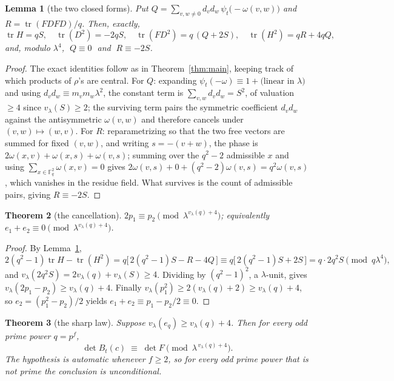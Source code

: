 \documentclass[11pt]{article}
\theoremstyle{plain}
\newtheorem{theorem}{Theorem}
\newtheorem{lemma}[theorem]{Lemma}
\theoremstyle{definition}
\newcommand{\FF}{\mathbb F}
\newcommand{\tr}{\operatorname{tr}}
\newcommand{\vlam}{v_\lambda}
\begin{document}
\begin{lemma}[the two closed forms]\label{lem:closed}
Put $Q=\sum_{v,w\neq0}d_vd_w\,\psi_t\bigl(-\omega(v,w)\bigr)$ and
$R=\tr(FDFD)/q$. Then, exactly,
\[
\tr H=qS,\quad \tr(D^2)=-2qS,\quad \tr(FD^2)=q\,(Q+2S),\quad
\tr(H^2)=qR+4qQ,
\]
and, modulo $\lambda^{4}$, $\;Q\equiv0\;$ and $\;R\equiv-2S$.
\end{lemma}

\begin{proof}
The exact identities follow as in Theorem~\ref{thm:main}, keeping track of
which products of $\rho$'s are central. For $Q$: expanding
$\psi_t(-\omega)\equiv1+\text{(linear in }\lambda)$ and using
$d_vd_w\equiv m_vm_w\lambda^2$, the constant term is
$\sum_{v,w}d_vd_w=S^2$, of valuation $\ge4$ since $\vlam(S)\ge2$; the surviving
term pairs the symmetric coefficient $d_vd_w$ against the antisymmetric
$\omega(v,w)$ and therefore cancels under $(v,w)\mapsto(w,v)$. For $R$:
reparametrizing so that the two free vectors are summed for fixed $(v,w)$, and
writing $s=-(v+w)$, the phase is $2\omega(x,v)+\omega(x,s)+\omega(v,s)$; summing
over the $q^2-2$ admissible $x$ and using
$\sum_{x\in\FF_q^2}\omega(x,v)=0$ gives
$2\omega(v,s)+0+(q^2-2)\omega(v,s)=q^{2}\omega(v,s)$, which vanishes in the
residue field. What survives is the count of admissible pairs, giving
$R\equiv-2S$.
\end{proof}

\begin{theorem}[the cancellation]\label{thm:cancel}
$2p_1\equiv p_2\pmod{\lambda^{\vlam(q)+4}}$; equivalently
$e_1+e_2\equiv0\pmod{\lambda^{\vlam(q)+4}}$.
\end{theorem}

\begin{proof}
By Lemma~\ref{lem:closed},
\[
2(q^2-1)\tr H-\tr(H^2)=q\bigl[\,2(q^2-1)S-R-4Q\,\bigr]
\equiv q\bigl[\,2(q^2-1)S+2S\,\bigr]=q\cdot 2q^2S \pmod{q\lambda^4},
\]
and $\vlam(2q^{2}S)=2\vlam(q)+\vlam(S)\ge4$. Dividing by $(q^2-1)^2$, a
$\lambda$-unit, gives $\vlam(2p_1-p_2)\ge\vlam(q)+4$. Finally
$\vlam(p_1^{2})\ge2(\vlam(q)+2)\ge\vlam(q)+4$, so
$e_2=(p_1^{2}-p_2)/2$ yields $e_1+e_2\equiv p_1-p_2/2\equiv0$.
\end{proof}

\begin{theorem}[the sharp law]\label{thm:sharp}
Suppose $\vlam(e_q)\ge\vlam(q)+4$. Then for every odd prime power $q=p^f$,
\[
\det B_t(c)\;\equiv\;\det F\pmod{\lambda^{\,\vlam(q)+4}} .
\]
The hypothesis is automatic whenever $f\ge2$, so for every odd prime power that
is not prime the conclusion is unconditional.
\end{theorem}
\end{document}

